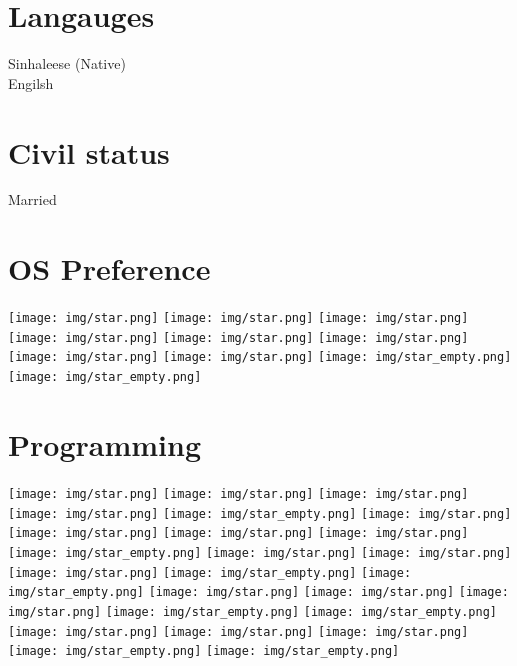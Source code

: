 \documentclass[]{cv-class}
\begin{document}
\begin{aside}
  \section{Langauges}
  	{\whitebodyfont Sinhaleese (Native)\\
    Engilsh}
    ~
  \section{Civil status}
    {\whitebodyfont Married}
  	~  
  \section{OS Preference}
    {\texttt{[image: img/star.png]}
    \texttt{[image: img/star.png]}
    \texttt{[image: img/star.png]}
    \texttt{[image: img/star.png]}
    \texttt{[image: img/star.png]}}
    {\texttt{[image: img/star.png]}
    \texttt{[image: img/star.png]}
    \texttt{[image: img/star.png]}
    \texttt{[image: img/star\_empty.png]}
    \texttt{[image: img/star\_empty.png]}}
    ~
  \section{Programming}
    {\texttt{[image: img/star.png]}
    \texttt{[image: img/star.png]}
    \texttt{[image: img/star.png]}
    \texttt{[image: img/star.png]}
    \texttt{[image: img/star\_empty.png]}}
    {\texttt{[image: img/star.png]}
    \texttt{[image: img/star.png]}
    \texttt{[image: img/star.png]}
    \texttt{[image: img/star.png]}
    \texttt{[image: img/star\_empty.png]}}
    {\texttt{[image: img/star.png]}
    \texttt{[image: img/star.png]}
    \texttt{[image: img/star.png]}
    \texttt{[image: img/star\_empty.png]}
    \texttt{[image: img/star\_empty.png]}}
    {\texttt{[image: img/star.png]}
    \texttt{[image: img/star.png]}
    \texttt{[image: img/star.png]}
    \texttt{[image: img/star\_empty.png]}
    \texttt{[image: img/star\_empty.png]}}
    {\texttt{[image: img/star.png]}
    \texttt{[image: img/star.png]}
    \texttt{[image: img/star.png]}
    \texttt{[image: img/star\_empty.png]}
    \texttt{[image: img/star\_empty.png]}}
    ~
\end{aside}
\end{document}
